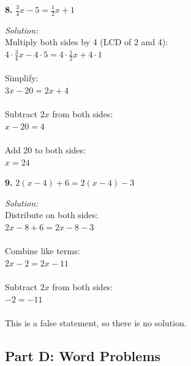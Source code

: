 \documentclass[12pt]{article}
\begin{document}
                \vspace{0.5cm}

            \textbf{8.} $\frac{3}{4}x - 5 = \frac{1}{2}x + 1$

                \textit{Solution:}\\
                Multiply both sides by 4 (LCD of 2 and 4):\\
                $4 \cdot \frac{3}{4}x - 4 \cdot 5 = 4 \cdot \frac{1}{2}x + 4 \cdot 1$\\
                \\
                Simplify:\\
                $3x - 20 = 2x + 4$\\
                \\
                Subtract $2x$ from both sides:\\
                $x - 20 = 4$\\
                \\
                Add 20 to both sides:\\
                $x = 24$


                \newpage

            \textbf{9.} $2(x - 4) + 6 = 2(x - 4) - 3$

                \textit{Solution:}\\
                Distribute on both sides:\\
                $2x - 8 + 6 = 2x - 8 - 3$\\
                \\
                Combine like terms:\\
                $2x - 2 = 2x - 11$\\
                \\
                Subtract $2x$ from both sides:\\
                $-2 = -11$\\
                \\
                This is a false statement, so there is no solution.


                \newpage

        \subsection*{Part D: Word Problems}
\end{document}
